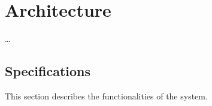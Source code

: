 \chapter{Architecture}
\label{cha:architecture}
\dots

\section{Specifications}
\label{sec:specs}
This section describes the functionalities of the system. 